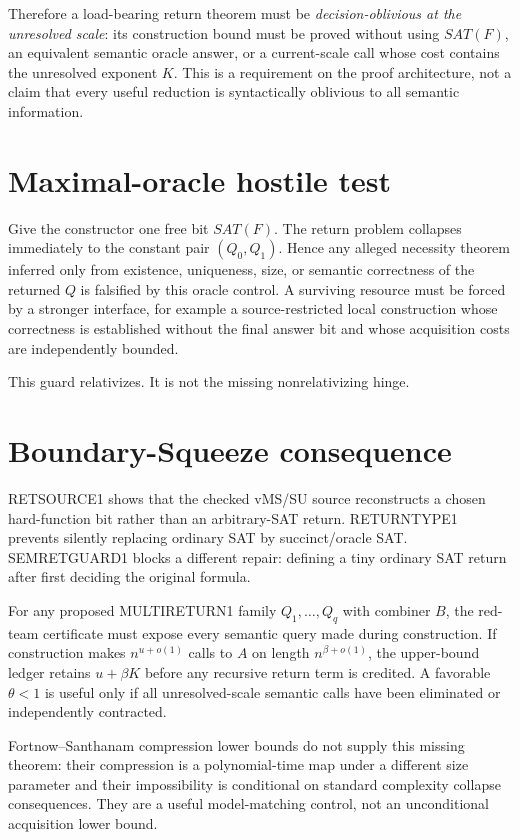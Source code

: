 \documentclass[11pt]{article}
\begin{document}
Therefore a load-bearing return theorem must be \emph{decision-oblivious at the unresolved scale}: its construction bound must be proved without using $SAT(F)$, an equivalent semantic oracle answer, or a current-scale call whose cost contains the unresolved exponent $K$. This is a requirement on the proof architecture, not a claim that every useful reduction is syntactically oblivious to all semantic information.

\section*{Maximal-oracle hostile test}
Give the constructor one free bit $SAT(F)$. The return problem collapses immediately to the constant pair $(Q_0,Q_1)$. Hence any alleged necessity theorem inferred only from existence, uniqueness, size, or semantic correctness of the returned $Q$ is falsified by this oracle control. A surviving resource must be forced by a stronger interface, for example a source-restricted local construction whose correctness is established without the final answer bit and whose acquisition costs are independently bounded.

This guard relativizes. It is not the missing nonrelativizing hinge.

\section*{Boundary-Squeeze consequence}
RETSOURCE1 shows that the checked vMS/SU source reconstructs a chosen hard-function bit rather than an arbitrary-SAT return. RETURNTYPE1 prevents silently replacing ordinary SAT by succinct/oracle SAT. SEMRETGUARD1 blocks a different repair: defining a tiny ordinary SAT return after first deciding the original formula.

For any proposed MULTIRETURN1 family $Q_1,\ldots,Q_q$ with combiner $B$, the red-team certificate must expose every semantic query made during construction. If construction makes $n^{u+o(1)}$ calls to $A$ on length $n^{\beta+o(1)}$, the upper-bound ledger retains $u+\beta K$ before any recursive return term is credited. A favorable $\theta<1$ is useful only if all unresolved-scale semantic calls have been eliminated or independently contracted.

Fortnow--Santhanam compression lower bounds do not supply this missing theorem: their compression is a polynomial-time map under a different size parameter and their impossibility is conditional on standard complexity collapse consequences. They are a useful model-matching control, not an unconditional acquisition lower bound.
\end{document}
